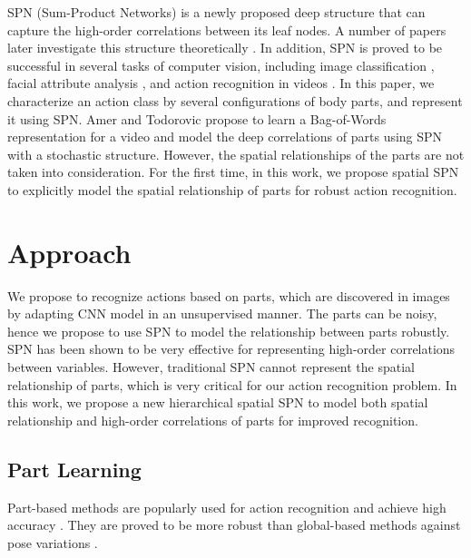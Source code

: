 \documentclass[journal]{IEEEtran}
\begin{document}
SPN (Sum-Product Networks) \cite{poon2011SPNIntroduce} is a newly proposed deep structure that can capture the high-order correlations between its leaf nodes. A number of papers later investigate this structure theoretically \cite{Delalleau11shallowvs,DirectIndirectSPNicml2014c1_rooshenas14}. In addition, SPN is proved to be successful in several tasks of computer vision, including image classification \cite{Discriminative_Learning_SPNNIPS2012_4516}, facial attribute analysis \cite{SPNWangXiaogangFacial}, and action recognition in videos \cite{SPN_video_action}.
In this paper, we characterize an action class by several configurations of body parts, and represent it using SPN.
Amer and Todorovic \cite{SPN_video_action} propose to learn a Bag-of-Words representation for a video and model the deep correlations of parts using SPN with a stochastic structure. However, the spatial relationships of the parts are not taken into consideration.
For the first time, in this work, we propose spatial SPN to explicitly model the spatial relationship of parts for robust action recognition.





\section{Approach}
\label{Sec:Approach}


We propose to recognize actions based on parts, which are discovered in images by adapting CNN model in an unsupervised manner. The parts can be noisy, hence we propose to use SPN to model the relationship between parts robustly.
SPN \cite{poon2011SPNIntroduce} has been shown to be very effective for representing high-order correlations between variables. However, traditional SPN cannot represent the spatial relationship of parts, which is very critical for our action recognition problem. In this work, we propose a new hierarchical spatial SPN to model both spatial relationship and high-order correlations of parts for improved recognition.



\subsection{Part Learning}
\label{section_part_learning}

Part-based methods \cite{liuting} are popularly used for action recognition and achieve high accuracy \cite{YangWMCVPR10,MajiActionCVPR11,YiYangCVPR2011:APE:2191740.2192012,Yao11humanaction__Stanford40,sharma:CVPR2013,Shahroudy2015Multimodal}.
They are proved to be more robust than global-based methods against pose variations \cite{YangWMCVPR10,FelzenszwalbMR_CVPR_2008}.
\end{document}
